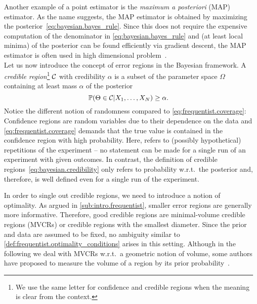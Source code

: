 Another example of a point estimator is the \emph{maximum a posteriori} (MAP) estimator.
As the name suggests, the MAP estimator is obtained by maximizing the posterior~\eqref{eq:bayesian.bayes_rule}.
Since this does not require the expensive computation of the denominator in \cref{eq:bayesian.bayes_rule} and (at least local minima) of the posterior can be found efficiently via gradient descent, the MAP estimator is often used in high dimensional problem~\cite{Murphy_2012_Machine}.\\


Let us now introduce the concept of error regions in the Bayesian framework.
A \emph{credible region}\footnote{%
  We use the same letter for confidence and credible regions when the meaning is clear from the context.
}
$\mathcal{C}$ with credibility $\alpha$ is a subset of the parameter space $\Omega$ containing at least mass $\alpha$ of the posterior
\[
  \label{eq:bayesian.credibility}
  \mathbb{P}(\Theta \in \mathcal{C} | X_1, \ldots, X_N) \ge \alpha.
\]
Notice the different notion of randomness compared to \cref{eq:frequentist.coverage}:
Confidence regions are random variables due to their dependence on the data and \cref{eq:frequentist.coverage} demands that the true value is contained in the confidence region with high probability.
Here,  refers to (possibly hypothetical) repetitions of the experiment -- no statement can be made for a single run of an experiment with given outcomes.
In contrast, the definition of credible regions~\eqref{eq:bayesian.credibility} only refers to probability w.r.t.\ the posterior and, therefore, is well defined even for a single run of the experiment.

In order to single out  credible regions, we need to introduce a notion of optimality.
As argued in \cref{sub:intro.frequentist}, smaller error regions are generally more informative.
Therefore, good credible regions are minimal-volume credible regions (MVCRs) or credible regions with the smallest diameter.
Since the prior and data are  assumed to be fixed, no ambiguity similar to \cref{def:frequentist.optimality_conditions} arises in this setting.
Although in the following we deal with MVCRs w.r.t.\ a geometric notion of volume, some authors have proposed to measure the volume of a region by its prior probability~\cite{Evans_2006_Optimally,Shang_2013_Optimal}.





